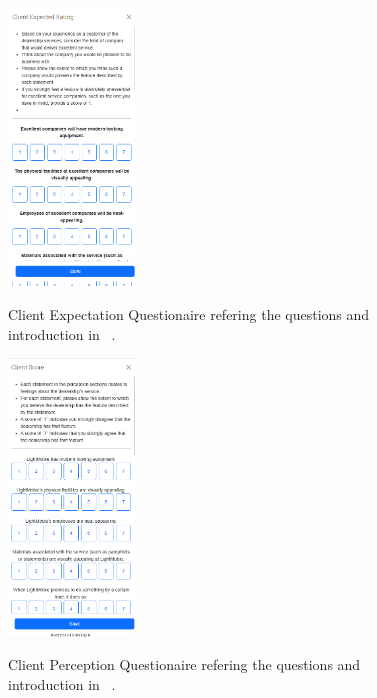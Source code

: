 \begin{figure}[htbp]
  \caption{Client Expectation Questionaire refering the questions and introduction in ~\cite{master_servqual_model}.}
  \centering
  \includegraphics[width=0.30\textwidth]{figs/Implementation/client/ExpectationQuestionare}
  \label{fig:ExpectationQuestionare}
\end{figure}


\begin{figure}[htbp]
  \caption{Client Perception Questionaire refering the questions and introduction in ~\cite{master_servqual_model}.}
  \centering
  \includegraphics[width=0.30\textwidth]{figs/Implementation/client/PerceptionQuestionare}
  \label{fig:PerceptionQuestionare}
\end{figure}


